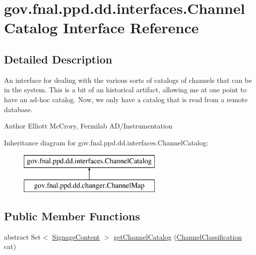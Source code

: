 \hypertarget{interfacegov_1_1fnal_1_1ppd_1_1dd_1_1interfaces_1_1ChannelCatalog}{\section{gov.\-fnal.\-ppd.\-dd.\-interfaces.\-Channel\-Catalog Interface Reference}
\label{interfacegov_1_1fnal_1_1ppd_1_1dd_1_1interfaces_1_1ChannelCatalog}
}


\subsection{Detailed Description}
An interface for dealing with the various sorts of catalogs of channels that can be in the system. This is a bit of an historical artifact, allowing me at one point to have an ad-\/hoc catalog. Now, we only have a catalog that is read from a remote database.

\begin{DoxyAuthor}{Author}
Elliott Mc\-Crory, Fermilab A\-D/\-Instrumentation 
\end{DoxyAuthor}
Inheritance diagram for gov.\-fnal.\-ppd.\-dd.\-interfaces.\-Channel\-Catalog\-:\begin{figure}[H]
\begin{center}
\leavevmode
\includegraphics[height=2.000000cm]{interfacegov_1_1fnal_1_1ppd_1_1dd_1_1interfaces_1_1ChannelCatalog}
\end{center}
\end{figure}
\subsection*{Public Member Functions}
\begin{DoxyCompactItemize}
\item 
abstract Set$<$ \hyperlink{interfacegov_1_1fnal_1_1ppd_1_1dd_1_1signage_1_1SignageContent}{Signage\-Content} $>$ \hyperlink{interfacegov_1_1fnal_1_1ppd_1_1dd_1_1interfaces_1_1ChannelCatalog_ad80585eea22d7939113a225e4f63a929}{get\-Channel\-Catalog} (\hyperlink{classgov_1_1fnal_1_1ppd_1_1dd_1_1changer_1_1ChannelClassification}{Channel\-Classification} cat)
\end{DoxyCompactItemize}


